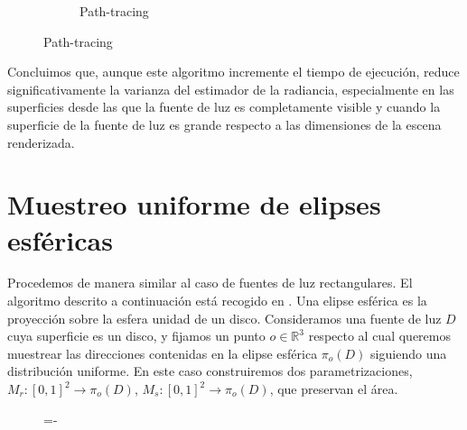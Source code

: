 \begin{figure}[h!]
{\begin{minipage}{\dimexpr .5\textwidth-\fboxsep-2\fboxrule}
\begin{subfigure}{\textwidth}
            \caption{Path-tracing}
            \end{subfigure}  
    \end{minipage}}
\end{figure}

Concluimos que, aunque este algoritmo incremente el tiempo de ejecución, reduce significativamente la varianza del estimador de la radiancia, especialmente en las superficies desde las que la fuente de luz es completamente visible y cuando la superficie de la fuente de luz es grande respecto a las dimensiones de la escena renderizada. 
 

\section{Muestreo uniforme de elipses esféricas}

Procedemos de manera similar al caso de fuentes de luz rectangulares. El algoritmo descrito a continuación está recogido en \cite{Guillen2017}. Una elipse esférica es la proyección sobre la esfera unidad de un disco. Consideramos una fuente de luz $D$ cuya superficie es un disco, y fijamos un punto $o\in\mathds{R}^3$ respecto al cual queremos muestrear las direcciones contenidas en la elipse esférica $\pi_o(D)$ siguiendo una distribución uniforme. En este caso construiremos dos parametrizaciones, $M_r:[0,1]^2\rightarrow \pi_o(D)$, $M_s:[0,1]^2\rightarrow \pi_o(D)$, que preservan el área.

\begin{figure}[h]
  \lineskip=-\fboxrule
\end{figure}


